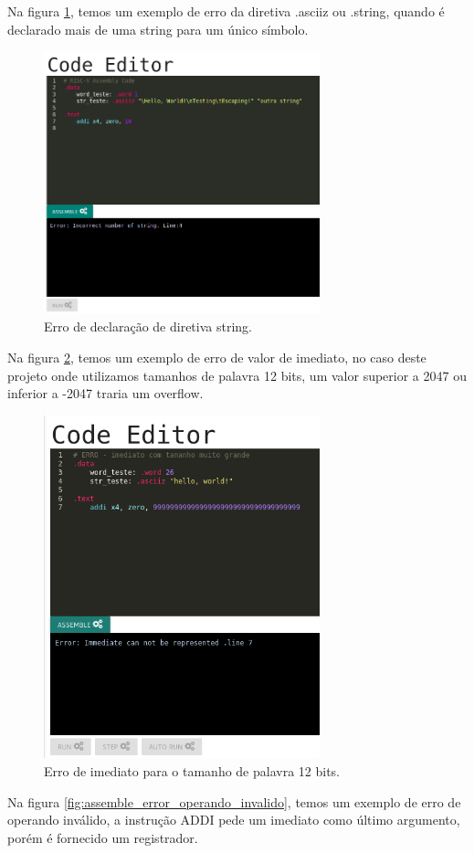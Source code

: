 	 Na figura \ref{fig:assemble_error_directives_strings}, temos um exemplo de erro da diretiva .asciiz ou .string, quando é declarado mais de uma string para um único símbolo.
	

	\begin{figure}[h!]
	  \centering	  
	  \includegraphics[width=8cm]{img/assemble_error_directives_strings.png}
	  \caption{Erro de declaração de diretiva string.}
	  \label{fig:assemble_error_directives_strings}
	\end{figure}


	 Na figura \ref{fig:assemble_error_imediato}, temos um exemplo de erro de valor de imediato, no caso deste projeto onde utilizamos tamanhos de palavra 12 bits, um valor superior a 2047 ou inferior a -2047 traria um overflow.
	
	\begin{figure}[h!]
	  \centering
	  \includegraphics[width=8cm]{img/assemble_error_imediato.png}
	  \caption{Erro de imediato para o tamanho de palavra 12 bits.}
	  \label{fig:assemble_error_imediato}
	\end{figure}
	 Na figura \ref{fig:assemble_error_operando_invalido}, temos um exemplo de erro de operando inválido, a instrução ADDI pede um imediato como último argumento, porém é fornecido um registrador.
	
